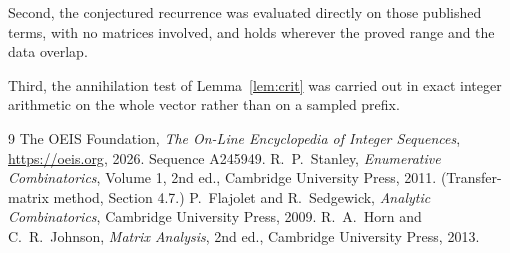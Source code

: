 \documentclass[11pt,a4paper]{article}
\theoremstyle{plain}
\theoremstyle{definition}
\begin{document}
Second, the conjectured recurrence was evaluated directly on those published terms, with no
matrices involved, and holds wherever the proved range and the data overlap.

Third, the annihilation test of Lemma~\ref{lem:crit} was carried out in exact integer
arithmetic on the whole vector rather than on a sampled prefix.

\begin{thebibliography}{9}
 The OEIS Foundation, \emph{The On-Line Encyclopedia of Integer
Sequences}, \url{https://oeis.org}, 2026. Sequence A245949.
 R.~P.~Stanley, \emph{Enumerative Combinatorics}, Volume 1, 2nd ed.,
Cambridge University Press, 2011. (Transfer-matrix method, Section 4.7.)
 P.~Flajolet and R.~Sedgewick, \emph{Analytic Combinatorics}, Cambridge
University Press, 2009.
 R.~A.~Horn and C.~R.~Johnson, \emph{Matrix Analysis}, 2nd ed., Cambridge
University Press, 2013.
\end{thebibliography}
\end{document}
